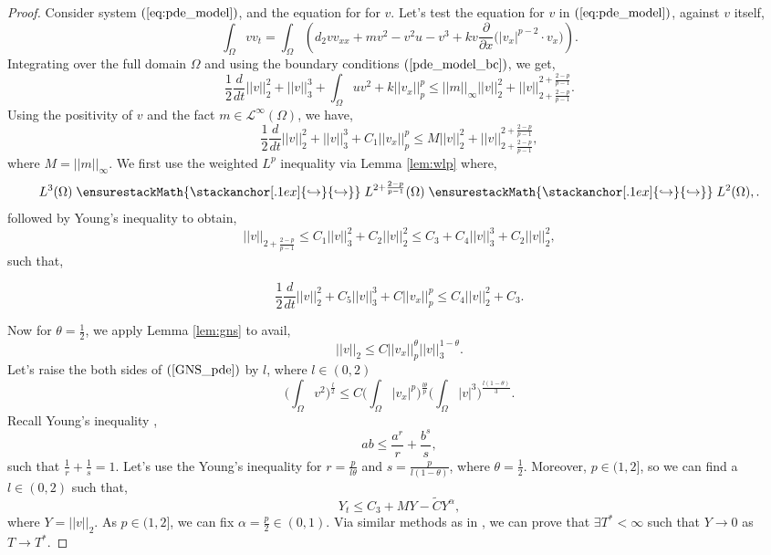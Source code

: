 \documentclass[10pt]{amsart}
\newcommand\dhookrightarrow{\mathrel{%
  \ensurestackMath{\stackanchor[.1ex]{\hookrightarrow}{\hookrightarrow}}
}}
\theoremstyle{plain}
\theoremstyle{definition}
\begin{document}
\begin{proof}
Consider system $(\ref{eq:pde_model})$, and the equation for for $v$. Let's test the equation for $v$ in  $(\ref{eq:pde_model})$, against $v$ itself,
\[ \int_{\Omega}v v_t =\int_{\Omega}\left( d_2  v v_{xx}  + m v^2 -v^2u-v^3 + k v \dfrac{\partial}{\partial x} \Big(|v_x|^{p-2} \cdot v_x \Big) \right).\]
Integrating over the full domain $\Omega$ and using the boundary conditions $(\ref{pde_model_bc})$, we get,
\[ \dfrac{1}{2} \dfrac{d}{dt} ||v||_2^2 +  ||v||_3^3 + \int_\Omega uv^2 + k ||v_x||_p^p \le ||m||_{\infty}||v||_2^2 + ||v||_{2 + \frac{2-p}{p-1}}^{2 + \frac{2-p}{p-1}} .\]
Using the positivity of $v$ and the fact $m\in \mathcal{L}^{\infty} (\Omega)$, we have,
\[ \dfrac{1}{2} \dfrac{d}{dt} ||v||_2^2 +  ||v||_3^3 + C_{1}||v_x||_p^p \le M ||v||_2^2 + ||v||_{2 + \frac{2-p}{p-1}}^{2 + \frac{2-p}{p-1}},\]
where $M=||m||_{\infty}.$
We first use the weighted $L^{p}$ inequality via Lemma \ref{lem:wlp} where,
\[  L^{3}(\Omega) \dhookrightarrow L^{2 + \frac{2-p}{p-1}}(\Omega) \dhookrightarrow L^{2} (\Omega), .\]
followed by Young's inequality
to obtain,
\begin{equation}
    ||v||_{2 + \frac{2-p}{p-1}} \leq C_{1}||v||^{2}_{3} + C_{2}||v||^{2}_{2} \leq C_{3} + C_{4}||v||^{3}_{3} + C_{2}||v||^{2}_{2},
\end{equation}
%
such that,

\begin{equation}
    \dfrac{1}{2} \dfrac{d}{dt} ||v||_2^2 +  C_{5}||v||_3^3 + C ||v_x||_p^p \le C_{4}||v||_2^2 + C_{3} .
\end{equation}

Now for $\theta=\frac{1}{2}$, we apply Lemma \ref{lem:gns} to avail,
\begin{equation}\label{GNS_pde}
    ||v||_{2} \le C ||v_x||^{\theta}_{p} ||v||^{1-\theta}_{3}.
\end{equation}
%
Let's raise the both sides of $(\ref{GNS_pde})$ by $l$, where $l \in (0,2)$
\[ \Big( \int_\Omega v^2 \Big)^{\frac{l}{2}} \le C \Big( \int_\Omega |v_x|^{p} \Big)^{\frac{l \theta}{p}} \Big( \int_\Omega |v|^3 \Big)^{\frac{l(1-\theta)}{3}}. \]
%
Recall Young's inequality \cite{evans},
\[ ab \le \dfrac{a^r}{r} + \dfrac{b^s}{s}, \]
such that $\frac{1}{r} + \frac{1}{s}=1.$ 
Let's use the Young's inequality for $r = \frac{p}{l \theta}$ and $s=\frac{p}{l(1-\theta)}$, where $\theta = \frac{1}{2}$.  Moreover, $p \in (1,2]$, so we can find a $l \in (0,2)$ such that,
\begin{equation}\label{ODE}
    Y_t \le C_{3} + MY-\widetilde{C} Y^{\alpha},
\end{equation}
where $Y=||v||_2$. As $p\in (1,2]$, we can fix $\alpha =\frac{p}{2}\in (0,1).$ Via similar methods as in \cite{parshad2021some}, we can prove that $\exists T^*<\infty$ such that $Y \to 0$ as $T \to T^*$.






\end{proof}
\end{document}
